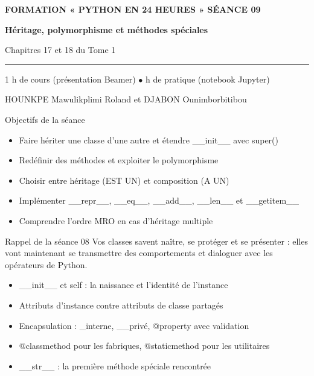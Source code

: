\documentclass[aspectratio=169,11pt]{beamer}
\begin{document}
{%
\begin{frame}[plain]
\vspace{10mm}
{\color{PyJaune}\small\bfseries FORMATION « PYTHON EN 24 HEURES » \quad\textbar\quad SÉANCE 09\par}
\vspace{4mm}
{\color{white}\Huge\bfseries Héritage, polymorphisme et méthodes spéciales\par}
\vspace{4mm}
{\color{PyBleuClair}\large Chapitres 17 et 18 du Tome 1\par}
\vspace{7mm}
{\color{PyJaune}\rule{34mm}{2.2pt}\par}
\vspace{7mm}
{\color{white}\normalsize 1 h de cours (présentation Beamer) \quad$\bullet$ h de pratique (notebook Jupyter)\par}
\vspace{2.5mm}
{\color{PyBleuClair}\normalsize HOUNKPE Mawulikplimi Roland et DJABON Ounimborbitibou\par}
\end{frame}
}
\begin{frame}{Objectifs de la séance}
\begin{itemize}
  \item Faire hériter une classe d'une autre et étendre \_\_init\_\_ avec super()
  \item Redéfinir des méthodes et exploiter le polymorphisme
  \item Choisir entre héritage (EST UN) et composition (A UN)
  \item Implémenter \_\_repr\_\_, \_\_eq\_\_, \_\_add\_\_, \_\_len\_\_ et \_\_getitem\_\_
  \item Comprendre l'ordre MRO en cas d'héritage multiple
\end{itemize}
\end{frame}
\begin{frame}{Rappel de la séance 08}
Vos classes savent naître, se protéger et se présenter : elles vont maintenant se transmettre des comportements et dialoguer avec les opérateurs de Python.

\begin{itemize}
  \item \_\_init\_\_ et self : la naissance et l'identité de l'instance
  \item Attributs d'instance contre attributs de classe partagés
  \item Encapsulation : \_interne, \_\_privé, @property avec validation
  \item @classmethod pour les fabriques, @staticmethod pour les utilitaires
  \item \_\_str\_\_ : la première méthode spéciale rencontrée
\end{itemize}
\end{frame}
\end{document}
